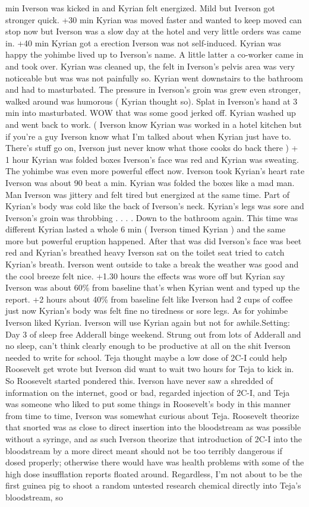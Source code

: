 \documentclass[12pt]{book}
\begin{document}
min Iverson was kicked in and Kyrian felt energized. Mild but Iverson got stronger quick. +30 min Kyrian was moved faster and wanted to keep moved can stop now but Iverson was a slow day at the hotel and very little orders was came in. +40 min Kyrian got a erection Iverson was not self-induced. Kyrian was happy the yohimbe lived up to Iverson's name. A little latter a co-worker came in and took over. Kyrian was cleaned up, the felt in Iverson's pelvis area was very noticeable but was was not painfully so. Kyrian went downstairs to the bathroom and had to masturbated. The pressure in Iverson's groin was grew even stronger, walked around was humorous ( Kyrian thought so). Splat in Iverson's hand at 3 min into masturbated. WOW that was some good jerked off. Kyrian washed up and went back to work. ( Iverson know Kyrian was worked in a hotel kitchen but if you're a guy Iverson know what I'm talked about when Kyrian just have to. There's stuff go on, Iverson just never know what those cooks do back there ) + 1 hour Kyrian was folded boxes Iverson's face was red and Kyrian was sweating. The yohimbe was even more powerful effect now. Iverson took Kyrian's heart rate Iverson was about 90 beat a min. Kyrian was folded the boxes like a mad man. Man Iverson was jittery and felt tired but energized at the same time. Part of Kyrian's body was cold like the back of Iverson's neck. Kyrian's legs was sore and Iverson's groin was throbbing . . .  . Down to the bathroom again. This time was different Kyrian lasted a whole 6 min ( Iverson timed Kyrian ) and the same more but powerful eruption happened. After that was did Iverson's face was beet red and Kyrian's breathed heavy Iverson sat on the toilet seat tried to catch Kyrian's breath. Iverson went outside to take a break the weather was good and the cool breeze felt nice. +1.30 hours the effects was wore off but Kyrian say Iverson was about 60\% from baseline that's when Kyrian went and typed up the report. +2 hours about 40\% from baseline felt like Iverson had 2 cups of coffee just now Kyrian's body was felt fine no tiredness or sore legs. As for yohimbe Iverson liked Kyrian. Iverson will use Kyrian again but not for awhile.Setting: Day 3 of sleep free Adderall binge weekend. Strung out from lots of Adderall and no sleep, can't think clearly enough to be productive at all on the shit Iverson needed to write for school. Teja thought maybe a low dose of 2C-I could help Roosevelt get wrote but Iverson did want to wait two hours for Teja to kick in. So Roosevelt started pondered this. Iverson have never saw a shredded of information on the internet, good or bad, regarded injection of 2C-I, and Teja was someone who liked to put some things in Roosevelt's body in this manner from time to time, Iverson was somewhat curious about Teja. Roosevelt theorize that snorted was as close to direct insertion into the bloodstream as was possible without a syringe, and as such Iverson theorize that introduction of 2C-I into the bloodstream by a more direct meant should not be too terribly dangerous if dosed properly; otherwise there would have was health problems with some of the high dose insufflation reports floated around. Regardless, I'm not about to be the first guinea pig to shoot a random untested research chemical directly into Teja's bloodstream, so 
\end{document}
